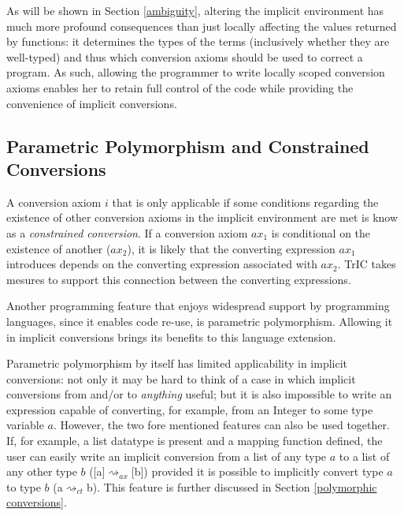 
As will be shown in Section \ref{ambiguity}, altering the implicit environment has much more profound consequences than just locally affecting the values returned by functions: it determines the types of the terms (inclusively whether they are well-typed) and thus which conversion axioms should be used to correct a program. As such, allowing the programmer to write locally scoped conversion axioms enables her to retain full control of the code while providing the convenience of implicit conversions. 




\subsection{Parametric Polymorphism and Constrained Conversions}
\label{param4}
A conversion axiom $i$ that is only applicable if some conditions regarding the existence of other conversion axioms in the implicit environment are met is know as a \textit{constrained conversion}. If a conversion axiom $ax_1$ is conditional on the existence of another ($ax_2$), it is likely that the converting expression $ax_1$ introduces depends on the converting expression associated with $ax_2$. TrIC takes mesures to support this connection between the converting expressions.

Another programming feature that enjoys widespread support by programming languages, since it enables code re-use, is parametric polymorphism. Allowing it in implicit conversions brings its benefits to this language extension.

Parametric polymorphism by itself has limited applicability in implicit conversions: not only it may be hard to think of a case in which implicit conversions from and/or to \textit{anything} useful; but it is also impossible to write an expression capable of converting, for example, from an Integer to some type variable $a$. However, the two fore mentioned features can also be used together. If, for example, a list datatype is present and a mapping function defined, the user can easily write an implicit conversion from a list of any type $a$ to a list of any other type $b$ ([a]$\rightsquigarrow_{ax}$[b]) provided it is possible to implicitly convert type $a$ to type $b$ (a$\rightsquigarrow_{ct}$b). This feature is further discussed in Section \ref{polymorphic conversions}.



